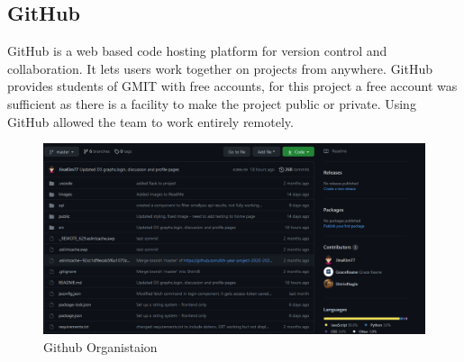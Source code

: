 \subsection{GitHub}
GitHub is a web based code hosting platform for version control and collaboration. It lets users work together on projects from anywhere.\cite{github}
GitHub provides students of GMIT with free accounts, for this project a free account was sufficient as there is a facility to make the project public or private. Using GitHub allowed the team to work entirely remotely.
\begin{figure}
    \centering
    \includegraphics[scale=0.5]{img/github.PNG}
    \caption{Github Organistaion}
    \label{fig:my_label1}
\end{figure}





